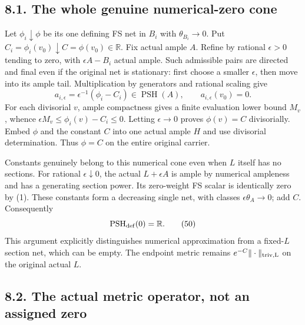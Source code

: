 \documentclass[
  10pt,
]{article}
\begin{document}
\subsection{8.1. The whole genuine numerical-zero
cone}\label{the-whole-genuine-numerical-zero-cone}

Let \(\phi_i\downarrow\phi\) be its one defining FS net in \(B_i\) with
\(\theta_{B_i}\to0\). Put
\(C_i=\phi_i(v_0)\downarrow C=\phi(v_0)\in\mathbb R\). Fix actual ample
\(A\). Refine by rational \(\epsilon>0\) tending to zero, with
\(\epsilon A-B_i\) actual ample. Such admissible pairs are directed and
final even if the original net is stationary: first choose a smaller
\(\epsilon\), then move into its ample tail. Multiplication by
generators and rational scaling give
\[a_{i,\epsilon}=\epsilon^{-1}(\phi_i-C_i)\in\operatorname{PSH}(A),
\qquad a_{i,\epsilon}(v_0)=0.\tag{49}\] For each divisorial \(v\), ample
compactness gives a finite evaluation lower bound \(M_v\), whence
\(\epsilon M_v\leq\phi_i(v)-C_i\leq0\). Letting \(\epsilon\to0\) proves
\(\phi(v)=C\) divisorially. Embed \(\phi\) and the constant \(C\) into
one actual ample \(H\) and use divisorial determination. Thus \(\phi=C\)
on the entire original carrier.

Constants genuinely belong to this numerical cone even when \(L\) itself
has no sections. For rational \(\epsilon\downarrow0\), the actual
\(L+\epsilon A\) is ample by numerical ampleness and has a generating
section power. Its zero-weight FS scalar is identically zero by (1).
These constants form a decreasing single net, with classes
\(\epsilon\theta_A\to0\); add \(C\). Consequently
\[\operatorname{PSH}_{\rm def}(0)=\mathbb R.\tag{50}\] This argument
explicitly distinguishes numerical approximation from a fixed-\(L\)
section net, which can be empty. The endpoint metric remains
\(e^{-C}\|\cdot\|_{\rm triv,L}\) on the original actual \(L\).

\subsection{8.2. The actual metric operator, not an assigned
zero}\label{the-actual-metric-operator-not-an-assigned-zero}
\end{document}
